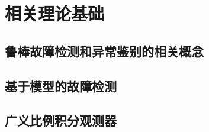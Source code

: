 \chapter{相关理论基础}\label{chap:2new}

\setcounter{algorithm}{0} %

\section{鲁棒故障检测和异常鉴别的相关概念}

\section{基于模型的故障检测}

\section{广义比例积分观测器}